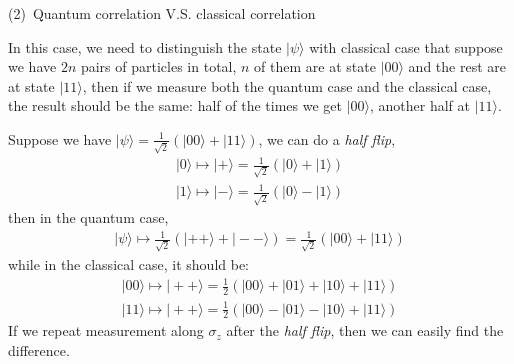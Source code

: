 \documentclass[UTF8,12pt]{article} %
\begin{document}
(2)~Quantum correlation V.S. classical correlation

In this case, we need to distinguish the state $|\psi\rangle$ with classical case that suppose we have $2n$ pairs of particles in total, $n$ of them are at state $|00\rangle$ and the rest are at state $|11\rangle$, then if we measure both the quantum case and the classical case, the result should be the same: half of the times we get $|00\rangle$, another half at $|11\rangle$.

Suppose we have $|\psi\rangle = \frac{1}{\sqrt{2}}\left(|00\rangle + |11\rangle\right)$, we can do a \textit{half flip},
\begin{align}
|0\rangle\longmapsto|+\rangle = \frac{1}{\sqrt{2}}(|0\rangle+|1\rangle)\\
|1\rangle\longmapsto|-\rangle = \frac{1}{\sqrt{2}}(|0\rangle-|1\rangle)
\end{align}
then in the quantum case,
\begin{align}
|\psi\rangle\longmapsto \frac{1}{\sqrt{2}}\left(|++\rangle + |--\rangle\right) = \frac{1}{\sqrt{2}}(|00\rangle + |11\rangle)
\end{align}
while in the classical case, it should be:
\begin{align}
|00\rangle\longmapsto |++\rangle = \frac{1}{2}(|00\rangle + |01\rangle + |10\rangle + |11\rangle) \\
|11\rangle\longmapsto |++\rangle = \frac{1}{2}(|00\rangle - |01\rangle - |10\rangle + |11\rangle)
\end{align}
If we repeat measurement along $\sigma_{z}$ after the \textit{half flip}, then we can easily find the difference.
\end{document}
